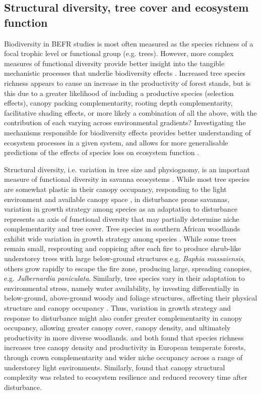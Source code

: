 \begin{refsection}
\subsection{Structural diversity, tree cover and ecosystem function}
\label{background:ssec:struc}

Biodiversity in BEFR studies is most often measured as the species richness of a focal trophic level or functional group (e.g. trees). However, more complex measures of functional diversity provide better insight into the tangible mechanistic processes that underlie biodiversity effects \citep{Finegan2015, Scherer-Lorenzen2014, Petchey2006}. Increased tree species richness appears to cause an increase in the productivity of forest stands, but is this due to a greater likelihood of including a productive species (selection effects), canopy packing complementarity, rooting depth complementarity, facilitative shading effects, or more likely a combination of all the above, with the contribution of each varying across environmental gradients? Investigating the mechanisms responsible for biodiversity effects provides better understanding of ecosystem processes in a given system, and allows for more generalisable predictions of the effects of species loss on ecosystem function \citep{Diaz2001, Petchey2006}.

Structural diversity, i.e. variation in tree size and physiognomy, is an important measure of functional diversity in savanna ecosystems \citep{Ali2016, Ali2019b, Pedro2017, Lecina-Diaz2018}. While most tree species are somewhat plastic in their canopy occupancy, responding to the light environment and available canopy space \citep{Jucker2015}, in disturbance prone savannas, variation in growth strategy among species as an adaptation to disturbance represents an axis of functional diversity that may partially determine niche complementarity and tree cover. Tree species in southern African woodlands exhibit wide variation in growth strategy among species \citep{Solbrig1996}. While some trees remain small, resprouting and coppicing after each fire to produce shrub-like understorey trees with large below-ground structures e.g. \textit{Baphia massaiensis}, others grow rapidly to escape the fire zone, producing large, spreading canopies, e.g. \textit{Julbernardia paniculata}. Similarly, tree species vary in their adaptation to environmental stress, namely water availability, by investing differentially in below-ground, above-ground woody and foliage structures, affecting their physical structure and canopy occupancy \citep{Sankaran2019}. Thus, variation in growth strategy and response to disturbance might also confer greater complementarity in canopy occupancy, allowing greater canopy cover, canopy density, and ultimately productivity in more diverse woodlands. \citet{Seidel2013} and \citet{Danescu2016} both found that species richness increases tree canopy density and productivity in European temperate forests, through crown complementarity and wider niche occupancy across a range of understorey light environments. Similarly, \citep{Seidl2014} found that canopy structural complexity was related to ecosystem resilience and reduced recovery time after disturbance. 


\end{refsection}
